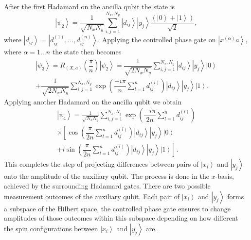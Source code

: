 \documentclass[pra,showkeys,twocolumn,showpacs]{revtex4-1}
\begin{document}
After the first Hadamard on the ancilla qubit the state is
%
\begin{equation}
    \left| \psi_2 \right\rangle =
    \frac{1}{\sqrt{N_x N_y}}\sum\limits_{i, j=1}^{N_x,N_y}
    \left| d_{ij} \right\rangle
    \left| y_j \right\rangle
    \dfrac{(\left| 0 \right\rangle + \left| 1 \right\rangle)}{\sqrt{2}},
\end{equation}
%
where $\left| d_{ij} \right\rangle = \left| d_{ij}^{(1)},\ldots,d_{ij}^{(n)} \right\rangle$.
Applying the controlled phase gate on $\left| x^{(\alpha)} a \right\rangle$, where $\alpha = 1\dots n$  the state then becomes
%
\begin{multline}
    \left| \psi_3 \right\rangle = R_{(X,a)}\left(\dfrac{\pi}{n}\right)\left| \psi_2 \right\rangle
     = \dfrac{1}{\sqrt{2 N_x N_y}}
				\sum\limits_{i, j=1}^{N_x,N_y}
				\left| d_{ij} \right\rangle
        \left| y_j \right\rangle
        \left| 0 \right\rangle
        \\ + \dfrac{1}{\sqrt{2 N_x N_y}}
				\sum\limits_{i, j=1}^{N_x,N_y}
        \exp\left(\dfrac{-i \pi}{n}\sum\limits_{l=1}^n d^{(l)}_{ij} \right)
        \left| d_{ij} \right\rangle
        \left| y_j \right\rangle
        \left| 1 \right\rangle .
\end{multline}
%
Applying another Hadamard on the ancilla qubit we obtain
%
\begin{multline}
    \left| \psi_4 \right\rangle =
    \frac{1}{\sqrt{N_x N_y}}\sum\limits_{i, j=1}^{N_x,N_y}
    \exp \left(\dfrac{-i \pi}{2n}\sum\limits_{l=1}^n d^{(l)}_{ij} \right)
		\\ \times
        \left[ \cos\left(\dfrac{\pi}{2n}\sum\limits_{l=1}^n d^{(l)}_{ij} \right)
        \left| d_{ij} \right\rangle
        \left| y_j \right\rangle
        \left| 0 \right\rangle\right.
        \\+
        \left. i \sin\left(\dfrac{\pi}{2n}\sum\limits_{l=1}^n d^{(l)}_{ij} \right)
        \left| d_{ij} \right\rangle
        \left| y_j \right\rangle
        \left| 1 \right\rangle\right] .
\end{multline}
%
This completes the step of projecting differences between pairs of $\left| x_i \right\rangle$ and $\left| y_j \right\rangle$ onto the amplitude of the auxiliary qubit.
The process is done in the $x$-basis, achieved by the surrounding Hadamard gates.
There are two possible measurement outcomes of the auxiliary qubit.
Each pair of $\left|x_i \right\rangle$ and $\left| y_j \right\rangle$ forms a subspace of the Hilbert space,
the controlled phase gate ensures to change amplitudes of those outcomes within this subspace depending on how different the spin configurations between $\left| x_i \right\rangle$ and $\left| y_j \right\rangle$ are.
\end{document}
